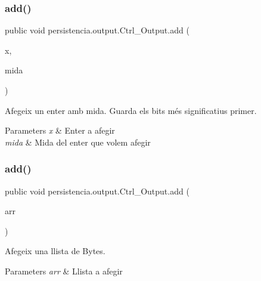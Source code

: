 \subsubsection{\texorpdfstring{add()}{add()}\hspace{0.1cm}{\footnotesize\ttfamily [5/6]}}
{\footnotesize\ttfamily public void persistencia.\+output.\+Ctrl\+\_\+\+Output.\+add (\begin{DoxyParamCaption}\item[{Integer}]{x,  }\item[{Integer}]{mida }\end{DoxyParamCaption})\hspace{0.3cm}{\ttfamily [inline]}}



Afegeix un enter amb mida. Guarda els bits més significatius primer. 


\begin{DoxyParams}{Parameters}
{\em x} & Enter a afegir \\
\hline
{\em mida} & Mida del enter que volem afegir \\
\hline
\end{DoxyParams}
\mbox{\label{classpersistencia_1_1output_1_1Ctrl__Output_a5fb2f07198a77b4fac0f95ee48e3d0b9}} 
\subsubsection{\texorpdfstring{add()}{add()}\hspace{0.1cm}{\footnotesize\ttfamily [6/6]}}
{\footnotesize\ttfamily public void persistencia.\+output.\+Ctrl\+\_\+\+Output.\+add (\begin{DoxyParamCaption}\item[{Array\+List$<$ Byte $>$}]{arr }\end{DoxyParamCaption})\hspace{0.3cm}{\ttfamily [inline]}}



Afegeix una llista de Bytes. 


\begin{DoxyParams}{Parameters}
{\em arr} & Llista a afegir \\
\hline
\end{DoxyParams}
\mbox{\label{classpersistencia_1_1output_1_1Ctrl__Output_ad4738467c2312b0e079c14003e548dd6}} 
